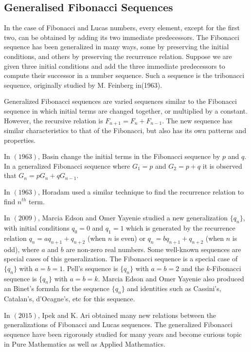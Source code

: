 \begin{large}
\subsection*{Generalised Fibonacci Sequences}
\noindent In the case of Fibonacci and Lucas numbers, every element, except for the first two, can be obtained by adding its two immediate predecessors. The Fibonacci sequence has been generalized in many ways, some by preserving the initial conditions, and others by preserving the recurrence relation. Suppose we are given three initial conditions and add the three immediate predecessors to compute their successor in a number sequence. Such a sequence is the tribonacci sequence, originally studied by M. Feinberg\cite{Fein-1} in(1963).

\noindent Generalized Fibonacci  sequences are varied sequences similar to the Fibonacci sequence in which initial terms are changed together, or multiplied by a constant. However, the recursive relation is $F_{n+1}=F_n + F_{n-1}$. The new sequence has similar characteristics to that of the Fibonacci, but also has its own patterns and properties.

\noindent In $(1963)$, Basin\cite{basin-1}  change the initial terms in the Fibonacci sequence  by $p$ and $q$. In a generalized Fibonacci sequence where $G_1=p$ and $G_2=p+q$ it is observed that $G_n= pG_n+qG_{n-1}$. 

\noindent In $(1963)$, Horadam\cite{Horadam-1} used a similar technique to find the recurrence relation to find  $n^{th}$ term. 

\noindent In $(2009)$, Marcia Edson and Omer Yayenie\cite{marcia} studied a new generalization $\lbrace q_n \rbrace$, with initial conditions $q_0 = 0$ and $q_1 = 1$ which is generated by the recurrence relation $q_n = aq_{n+1} + q_{n+2}$ (when $n$ is even) or $q_n = bq_{n+1} + q_{n+2}$ (when $n$ is odd), where $a$ and $b$ are non-zero real numbers. Some well-known sequences are special cases of this generalization. The Fibonacci sequence is a special case of $\lbrace q_n \rbrace$ with $a = b = 1$.
Pell's sequence is $\lbrace q_n \rbrace$ with $a = b = 2$ and the $k$-Fibonacci sequence is $\lbrace q_n \rbrace$ with $a = b = k$.
Marcia Edson and Omer Yayenie also produced an Binet's formula for the sequence $\lbrace q_n \rbrace$ and identities such as
Cassini's, Catalan's, d'Ocagne's, etc for this sequence.

\noindent In $(2015)$, Ipek and K. Ari\cite{ipek}  obtained many new relations between the generalizations of Fibonacci and Lucas sequences. The generalized Fibonacci sequence have been rigorously studied for many years and become curious topic in Pure Mathematics as well as Applied Mathematics. 


\end{large}
